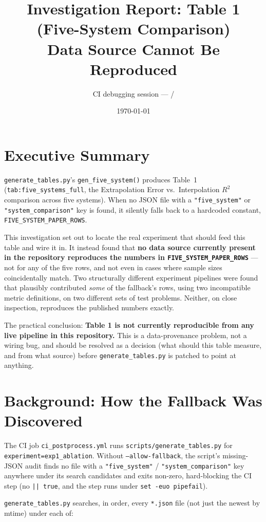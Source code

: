 \documentclass[11pt]{article}
\title{Investigation Report: Table 1 (Five-System Comparison)\\
       Data Source Cannot Be Reproduced}
\author{CI debugging session --- \code{ci\_postprocess.yml} / \code{exp1\_ablation}}
\date{\today}
\newcommand{\code}[1]{\texttt{#1}}
\begin{document}
\maketitle

\section*{Executive Summary}

\code{generate\_tables.py}'s \code{gen\_five\_system()} produces Table~1
(\code{tab:five\_systems\_full}, the Extrapolation Error vs.\ Interpolation
$R^2$ comparison across five systems). When no JSON file with a
\code{"five\_system"} or \code{"system\_comparison"} key is found, it silently
falls back to a hardcoded constant, \code{FIVE\_SYSTEM\_PAPER\_ROWS}.

This investigation set out to locate the real experiment that should feed
this table and wire it in. It instead found that \textbf{no data source
currently present in the repository reproduces the numbers in
\code{FIVE\_SYSTEM\_PAPER\_ROWS}} --- not for any of the five rows, and not
even in cases where sample sizes coincidentally match. Two structurally
different experiment pipelines were found that plausibly contributed
\emph{some} of the fallback's rows, using two incompatible metric
definitions, on two different sets of test problems. Neither, on close
inspection, reproduces the published numbers exactly.

The practical conclusion: \textbf{Table 1 is not currently reproducible from
any live pipeline in this repository.} This is a data-provenance problem,
not a wiring bug, and should be resolved as a decision (what should this
table measure, and from what source) before \code{generate\_tables.py} is
patched to point at anything.

\section{Background: How the Fallback Was Discovered}

The CI job \code{ci\_postprocess.yml} runs \code{scripts/generate\_tables.py}
for \code{experiment=exp1\_ablation}. Without \code{--allow-fallback}, the
script's missing-JSON audit finds no file with a \code{"five\_system"} /
\code{"system\_comparison"} key anywhere under its search candidates and
exits non-zero, hard-blocking the CI step (no \code{|| true}, and the step
runs under \code{set -euo pipefail}).

\code{generate\_tables.py} searches, in order, every \code{*.json} file
(not just the newest by mtime) under each of:
\end{document}
